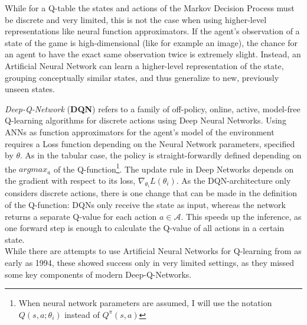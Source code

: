 While for a Q-table the states and actions of the Markov Decision Process must be discrete and very limited, this is not the case when using higher-level representations like neural function approximators. If the agent's observation of a state of the game is high-dimensional (like for example an image), the chance for an agent to have the exact same observation twice is extremely slight. Instead, an Artificial Neural Network can learn a higher-level representation of the state, grouping conceptually similar states, and thus generalize to new, previously unseen states. 

\textit{Deep-Q-Network} (\textbf{DQN}) refers to a family of off-policy, online, active, model-free Q-learning algorithms for discrete actions using Deep Neural Networks. %
Using ANNs as function approximators for the agent's model of the environment requires a Loss function depending on the Neural Network parameters, specified by $\theta$. As in the tabular case, the policy is straight-forwardly defined depending on the $argmax_a$ of the Q-function\footnote{When neural network parameters are assumed, I will use the notation $Q(s,a;\theta_i)$ instead of $Q^\pi(s,a)$}. The update rule in Deep Networks depends on the gradient with respect to its loss, $\nabla_{\theta_i}L(\theta_i)$.  %
As the DQN-architecture only considers discrete actions, there is one change that can be made in the definition of the Q-function: DQNs only receive the state as input, whereas the network returns a separate Q-value for each action $a \in \mathcal{A}$. This speeds up the inference, as one forward step is enough to calculate the Q-value of all actions in a certain state.\\

While there are attempts to use Artificial Neural Networks for Q-learning from as early as 1994\cite{rummery_-line_1994}, these showed success only in very limited settings, as they missed some key components of modern Deep-Q-Networks. 

